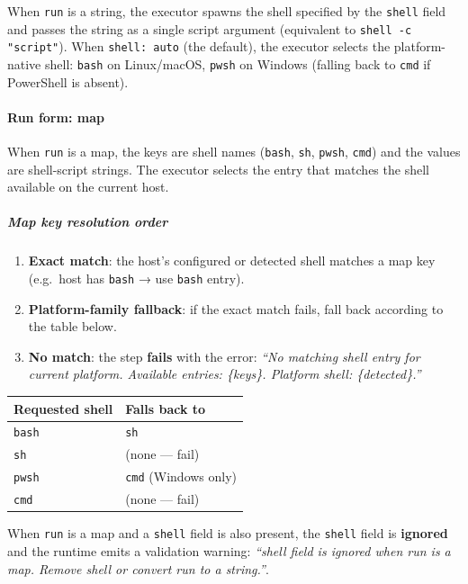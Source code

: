 When \texttt{run} is a string, the executor spawns the shell specified by the
\texttt{shell} field and passes the string as a single script argument (equivalent
to \texttt{shell -c "script"}).  When \texttt{shell: auto} (the default), the
executor selects the platform-native shell: \texttt{bash} on Linux/macOS,
\texttt{pwsh} on Windows (falling back to \texttt{cmd} if PowerShell is absent).

\paragraph{Run form: map}

When \texttt{run} is a map, the keys are shell names (\texttt{bash}, \texttt{sh},
\texttt{pwsh}, \texttt{cmd}) and the values are shell-script strings.  The
executor selects the entry that matches the shell available on the current host.

\subparagraph{Map key resolution order}

\begin{enumerate}
  \item \textbf{Exact match}: the host's configured or detected shell matches a
        map key (e.g.\ host has \texttt{bash} → use \texttt{bash} entry).
  \item \textbf{Platform-family fallback}: if the exact match fails, fall back
        according to the table below.
  \item \textbf{No match}: the step \textbf{fails} with the error:
        \textit{``No matching shell entry for current platform.
        Available entries: \{keys\}.  Platform shell: \{detected\}.''}
\end{enumerate}

\begin{center}
\begin{tabular}{ll}
\hline
\textbf{Requested shell} & \textbf{Falls back to} \\
\hline
\texttt{bash} & \texttt{sh} \\
\texttt{sh}   & (none — fail) \\
\texttt{pwsh} & \texttt{cmd} (Windows only) \\
\texttt{cmd}  & (none — fail) \\
\hline
\end{tabular}
\end{center}

When \texttt{run} is a map and a \texttt{shell} field is also present, the
\texttt{shell} field is \textbf{ignored} and the runtime emits a validation
warning: \textit{``shell field is ignored when run is a map.  Remove shell or
convert run to a string.''}.

